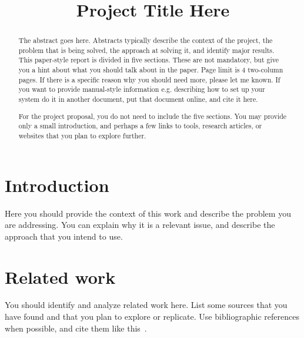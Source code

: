 \documentclass[conference, a4paper, 10pt]{IEEEtran}
\begin{document}
\title{Project Title Here}

\author{
\and
{}
\and
{}
\and
{}
}
\maketitle

\begin{abstract}
The abstract goes here. Abstracts typically describe the context of the project, the problem that is being solved, the approach at solving it, and identify major results.  This paper-style report is divided in five sections. These are not mandatory, but give you a hint about what you should talk about in the paper. Page limit is 4 two-column pages. If there is a specific reason why you should need more, please let me known. If you want to provide manual-style information e.g. describing how to set up your system do it in another document, put that document online, and cite it here.

For the project proposal, you do not need to include the five sections. You may provide only a small introduction, and perhaps a few links to tools, research articles, or websites that you plan to explore further. 

\end{abstract}

\section{Introduction}
Here you should provide the context of this work and describe the problem you are addressing. You can explain why it is a relevant issue, and describe the approach that you intend to use.

\section{Related work}
You should identify and analyze related work here. List some sources that you have found and that you plan to explore or replicate. Use bibliographic references when possible, and cite them like this~\cite{ArfaouiPrivacy2019}.
\end{document}

